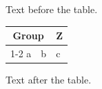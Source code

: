 \documentclass[12pt]{article}
\begin{document}
Text before the table.

\begin{tabular}{lll}\toprule \multicolumn{2}{c}{Group} & Z\\\cmidrule{1-2} a & b & c\\\bottomrule\end{tabular}

Text after the table.
\end{document}
